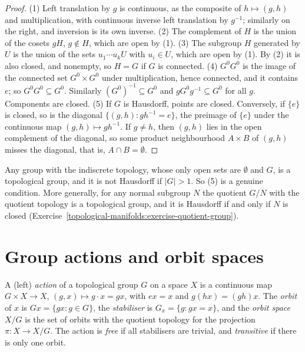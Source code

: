 \begin{proof}
(1) Left translation by $g$ is continuous, as the composite of $h \mapsto (g, h)$ and multiplication, with continuous inverse left translation by $g^{-1}$; similarly on the right, and inversion is its own inverse. (2) The
complement of $H$ is the union of the cosets $gH$, $g \notin H$, which are open by (1). (3) The subgroup $H$ generated by $U$ is the union of the sets $u_1 \cdots u_kU$ with $u_i \in U$, which are open by (1). By (2) it is
also closed, and nonempty, so $H = G$ if $G$ is connected. (4) $G^0G^0$ is the image of the connected set $G^0 \times G^0$ under multiplication, hence connected, and it contains $e$; so $G^0G^0 \subseteq G^0$.
Similarly $(G^0)^{-1} \subseteq G^0$ and $gG^0g^{-1} \subseteq G^0$ for all $g$. Components are closed. (5) If $G$ is Hausdorff, points are closed. Conversely, if $\{e\}$ is closed, so is the diagonal
$\{(g, h) : gh^{-1} = e\}$, the preimage of $\{e\}$ under the continuous map $(g, h) \mapsto gh^{-1}$. If $g \neq h$, then $(g, h)$ lies in the open complement of the diagonal, so some product neighbourhood $A \times B$ of
$(g, h)$ misses the diagonal, that is, $A \cap B = \emptyset$.
\end{proof}

\begin{counterexample}\label{topological-manifolds:counterexample-non-hausdorff-group}
Any group with the indiscrete topology, whose only open sets are $\emptyset$ and $G$, is a topological group, and it is not Hausdorff if $|G| > 1$. So (5) is a genuine condition. More generally, for any normal subgroup
$N$ the quotient $G/N$ with the quotient topology is a topological group, and it is Hausdorff if and only if $N$ is closed (Exercise~\ref{topological-manifolds:exercise-quotient-group}).
\end{counterexample}

\section{Group actions and orbit spaces}\label{topological-manifolds:section-actions}

\begin{definition}\label{topological-manifolds:definition-action}
A (left) \emph{action} of a topological group $G$ on a space $X$ is a continuous map $G \times X \to X$, $(g, x) \mapsto g \cdot x = gx$, with $ex = x$ and $g(hx) = (gh)x$. The \emph{orbit} of $x$ is $Gx = \{gx : g \in G\}$, the
\emph{stabiliser} is $G_x = \{g : gx = x\}$, and the \emph{orbit space} $X/G$ is the set of orbits with the quotient topology for the projection $\pi \colon X \to X/G$. The action is \emph{free} if all stabilisers are
trivial, and \emph{transitive} if there is only one orbit.
\end{definition}

